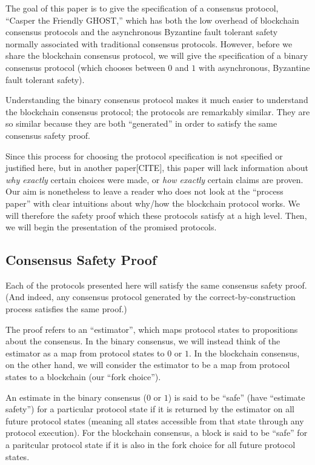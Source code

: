 \documentclass{article}
\theoremstyle{definition}
\begin{document}
The goal of this paper is to give the specification of a consensus protocol, ``Casper the Friendly GHOST,'' which has both the low overhead of blockchain consensus protocols and the asynchronous Byzantine fault tolerant safety normally associated with traditional consensus protocols. However, before we share the blockchain consensus protocol, we will give the specification of a binary consensus protocol (which chooses between $0$ and $1$ with asynchronous, Byzantine fault tolerant safety). 

Understanding the binary consensus protocol makes it much easier to understand the blockchain consensus protocol; the protocols are remarkably similar. They are so similar because they are both ``generated'' in order to satisfy the same consensus safety proof.

Since this process for choosing the protocol specification is not specified or justified here, but in another paper[CITE], this paper will lack information about \emph{why exactly} certain choices were made, or \emph{how exactly} certain claims are proven. Our aim is nonetheless to leave a reader who does not look at the ``process paper'' with clear intuitions about why/how the blockchain protocol works. We will therefore the safety proof which these protocols satisfy at a high level. Then, we will begin the presentation of the promised protocols.

\subsection{Consensus Safety Proof}

Each of the protocols presented here will satisfy the same consensus safety proof. (And indeed, any consensus protocol generated by the correct-by-construction process satisfies the same proof.) 

The proof refers to an ``estimator'', which maps protocol states to propositions about the consensus. In the binary consensus, we will instead think of the estimator as a map from protocol states to $0$ or $1$. In the blockchain consensus, on the other hand, we will consider the estimator to be a map from protocol states to a blockchain (our ``fork choice'').

An estimate in the binary consensus ($0$ or $1$) is said to be ``safe'' (have ``estimate safety'') for a particular protocol state if it is returned by the estimator on all future protocol states (meaning all states accessible from that state through any protocol execution). For the blockchain consensus, a block is said to be ``safe'' for a paritcular protocol state if it is also in the fork choice for all future protocol states.
\end{document}
